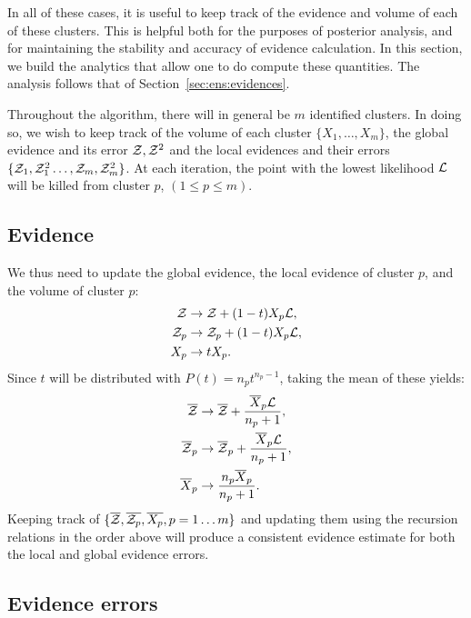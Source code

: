 In all of these cases, it is useful to keep track of the evidence and volume of each of these clusters. This is helpful both for the purposes of posterior analysis, and for maintaining the stability and accuracy of evidence calculation. In this section, we build the analytics that allow one to do compute these quantities. The analysis follows that of Section~\ref{sec:ens:evidences}.

Throughout the algorithm, there will in general be \(m\) identified clusters. In doing so, we wish to keep track of the volume of each cluster \(\{X_1,\ldots,X_m\}\), the global evidence and its error \(\mathcal{Z},\mathcal{Z}^2\) and the local evidences and their errors \(\{\mathcal{Z}_1,\mathcal{Z}_1^2\ldots,\mathcal{Z}_m,\mathcal{Z}_m^2\}\). At each iteration, the point with the lowest likelihood \(\mathcal{L}\) will be killed from cluster \(p\), \({(1\le p\le m)}\). 


\subsection{Evidence}
\label{sec:ens:cluster_ev}

We thus need to update the global evidence, the local evidence of cluster \(p\), and the volume of cluster \(p\):
%
\begin{align}
  \mathcal{Z} &\to \mathcal{Z} + (1-t)X_p\mathcal{L},
  \label{eqn:ens:rr_ev}\\
  \mathcal{Z}_p &\to \mathcal{Z}_p + (1-t)X_p\mathcal{L},
  \label{eqn:ens:rr_evi}\\
  X_p &\to t X_p.
  \label{eqn:ens:rr_Xi}
\end{align}
%
Since \(t\) will be distributed with \(P(t) = n_p t^{n_p-1}\),
taking the mean of these yields:
%
\begin{align}
  \overline{\mathcal{Z}} &\to \overline{\mathcal{Z}} + \frac{\overline X_p \mathcal{L}}{n_p+1},\\
  \overline{\mathcal{Z}}_p &\to \overline{\mathcal{Z}}_p + \frac{\overline X_p \mathcal{L}}{n_p+1},\\
  \overline X_p &\to \frac{n_p\overline X_p }{n_p+1}. 
\end{align}
%
Keeping track of \(\{\overline{\mathcal{Z}},\overline{\mathcal{Z}_p},\overline{X_p},p=1\ldots m\}\) and updating them using the recursion relations in the order above will produce a consistent evidence estimate for both the local and global evidence errors.


\subsection{Evidence errors}
\label{sec:ens:cluster_err}

